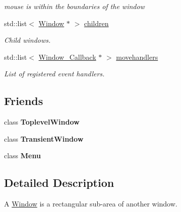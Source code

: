 \begin{DoxyCompactItemize}
\begin{DoxyCompactList}\small\item\em {\ttfamily mouse} is within the boundaries of the window \end{DoxyCompactList}\item 
std\-::list$<$ \hyperlink{classGUI_1_1Window}{Window} $\ast$ $>$ \hyperlink{classGUI_1_1Window_ac10e617306be4367ed164ea97f5d3132}{children}
\begin{DoxyCompactList}\small\item\em Child windows. \end{DoxyCompactList}\item 
\hypertarget{classGUI_1_1Window_a5dc78efd55a14098437cc25597c21bef}{std\-::list$<$ \hyperlink{structGUI_1_1Window__Callback}{Window\-\_\-\-Callback} $\ast$ $>$ \hyperlink{classGUI_1_1Window_a5dc78efd55a14098437cc25597c21bef}{movehandlers}}\label{classGUI_1_1Window_a5dc78efd55a14098437cc25597c21bef}

\begin{DoxyCompactList}\small\item\em List of registered event handlers. \end{DoxyCompactList}\end{DoxyCompactItemize}
\subsection*{Friends}
\begin{DoxyCompactItemize}
\item 
\hypertarget{classGUI_1_1Window_a47359b01fb4f622a9770ab8b22d75a63}{class {\bfseries Toplevel\-Window}}\label{classGUI_1_1Window_a47359b01fb4f622a9770ab8b22d75a63}

\item 
\hypertarget{classGUI_1_1Window_ac4d9da9cc48d502966fd1039d5ea85fa}{class {\bfseries Transient\-Window}}\label{classGUI_1_1Window_ac4d9da9cc48d502966fd1039d5ea85fa}

\item 
\hypertarget{classGUI_1_1Window_a834cec0fab7efabab3cd53540e4d466d}{class {\bfseries Menu}}\label{classGUI_1_1Window_a834cec0fab7efabab3cd53540e4d466d}

\end{DoxyCompactItemize}


\subsection{Detailed Description}
A \hyperlink{classGUI_1_1Window}{Window} is a rectangular sub-\/area of another window. 

